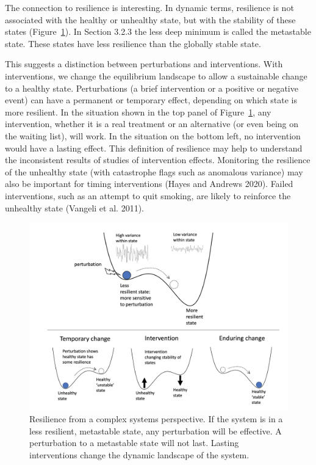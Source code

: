 \documentclass[
  letterpaper,
]{scrbook}
\begin{document}
The connection to resilience is interesting. In dynamic terms,
resilience is not associated with the healthy or unhealthy state, but
with the stability of these states (Figure~\ref{fig-ch6-img10-old-79}).
In Section 3.2.3 the less deep minimum is called the metastable state.
These states have less resilience than the globally stable state.

This suggests a distinction between perturbations and interventions.
With interventions, we change the equilibrium landscape to allow a
sustainable change to a healthy state. Perturbations (a brief
intervention or a positive or negative event) can have a permanent or
temporary effect, depending on which state is more resilient. In the
situation shown in the top panel of Figure~\ref{fig-ch6-img10-old-79},
any intervention, whether it is a real treatment or an alternative (or
even being on the waiting list), will work. In the situation on the
bottom left, no intervention would have a lasting effect. This
definition of resilience may help to understand the inconsistent results
of studies of intervention effects. Monitoring the resilience of the
unhealthy state (with catastrophe flags such as anomalous variance) may
also be important for timing interventions (Hayes and Andrews 2020).
Failed interventions, such as an attempt to quit smoking, are likely to
reinforce the unhealthy state (Vangeli et al. 2011).

\begin{figure}

{\centering \includegraphics[width=4.54449in,height=\textheight]{media/ch6/image10.jpg}

}

\caption{\label{fig-ch6-img10-old-79}Resilience from a complex systems
perspective. If the system is in a less resilient, metastable state, any
perturbation will be effective. A perturbation to a metastable state
will not last. Lasting interventions change the dynamic landscape of the
system.}

\end{figure}
\end{document}

